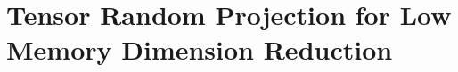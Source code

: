 \documentclass[phd,tocprelim]{cornell}
\numberwithin{equation}{section}
\begin{document}
\chapter{Tensor Random Projection for Low Memory Dimension Reduction}







\begin{subappendices}




\end{subappendices}
\clearpage


\end{document}

